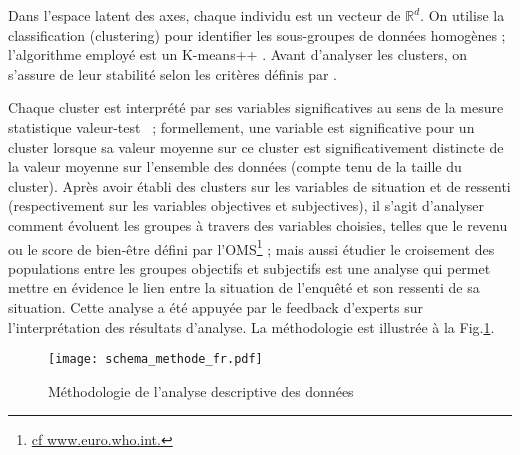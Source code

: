 \documentclass[11pt,fleqn,openany,frenchb]{book} %
\begin{document}
Dans l'espace latent des axes, chaque individu est un vecteur de
$\mathbb{R}^d$. On utilise la classification (clustering) pour
identifier les sous-groupes de données homogènes ; l'algorithme
employé est un K-means++ \cite{arthur2007k}. Avant d'analyser les
clusters, on s'assure de leur stabilité selon les critères définis par
\cite{meilua2006uniqueness}. \par

Chaque cluster est interprété par ses variables significatives au sens
de la mesure statistique valeur-test \cite{lebart2006statistique}~;
formellement, une variable est significative pour un cluster lorsque
sa valeur moyenne sur ce cluster est significativement distincte de la
valeur moyenne sur l'ensemble des données (compte tenu de la taille du
cluster). Après avoir établi des clusters sur les variables de
situation et de ressenti (respectivement sur les variables objectives
et subjectives), il s'agit d'analyser comment évoluent les groupes à
travers des variables choisies, telles que le revenu ou le score de
bien-être défini par
l'OMS\footnote{\href{http://www.euro.who.int/fr/publications/abstracts/measurement-of-and-target-setting-for-well-being-an-initiative-by-the-who-regional-office-for-europe}{cf
    www.euro.who.int.}} ; mais aussi étudier le croisement des
populations entre les groupes objectifs et subjectifs est une analyse
qui permet mettre en évidence le lien entre la situation de l'enquêté
et son ressenti de sa situation. Cette analyse a été appuyée par le 
feedback d'experts sur l'interprétation des résultats d'analyse.
La méthodologie est illustrée à la Fig.\ref{fig:metho}.\par

\begin{figure}[!h]
  \centering
  \texttt{[image: schema\_methode\_fr.pdf]}
  \caption{Méthodologie de l'analyse descriptive des données}
  \label{fig:metho}
\end{figure}
\end{document}
